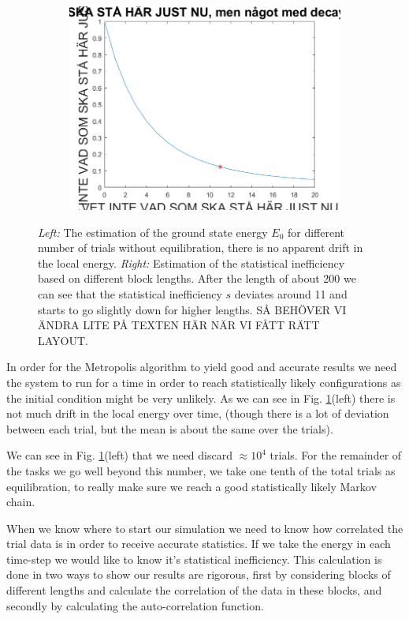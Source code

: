 \begin{figure}[H]
\begin{subfigure}[b]{0.48\textwidth}
		\includegraphics[width=\textwidth]{graphics/task2/auto_corr.png}
	\end{subfigure}
	\caption{\textit{Left:} The estimation of the ground state energy $E_0$ for different number of trials without equilibration, there is no apparent drift in the local energy. \textit{Right:} Estimation of the statistical inefficiency based on different block lengths. After the length of about 200 we can see that the statistical inefficiency $s$ deviates around 11 and starts to go slightly down for higher lengths. SÅ BEHÖVER VI ÄNDRA LITE PÅ TEXTEN HÄR NÄR VI FÅTT RÄTT LAYOUT. }
	\label{fig:block_error}
\end{figure}

In order for the Metropolis algorithm to yield good and accurate results we need the system to run for a time in order to reach statistically likely configurations as the initial condition might be very unlikely. As we can see in Fig. \ref{fig:block_error}(left) there is not much drift in the local energy over time, (though there is a lot of deviation between each trial, but the mean is about the same over the trials).

We can see in Fig. \ref{fig:block_error}(left) that we need discard $\approx10^4$ trials. For the remainder of the tasks we go well beyond this number, we take one tenth of the total trials as equilibration, to really make sure we reach a good statistically likely Markov chain.

When we know where to start our simulation we need to know how correlated the trial data is in order to receive accurate statistics. If we take the energy in each time-step we would like to know it's statistical inefficiency. This calculation is done in two ways to show our results are rigorous, first by considering blocks of different lengths and calculate the correlation of the data in these blocks, and secondly by calculating the auto-correlation function.

